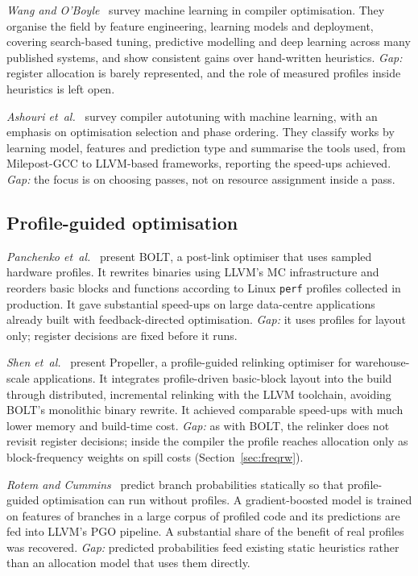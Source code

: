 \documentclass{ieeeaccess}
\begin{document}
\textit{Wang and O'Boyle}~\cite{wang2018ml} survey machine learning in
compiler optimisation. They organise the field by feature engineering,
learning models and deployment, covering search-based tuning,
predictive modelling and deep learning across many published systems,
and show consistent gains over hand-written heuristics.
\textit{Gap:} register allocation is barely represented, and the role of
measured profiles inside heuristics is left open.

\textit{Ashouri et~al.}~\cite{ashouri2018survey} survey compiler
autotuning with machine learning, with an emphasis on optimisation
selection and phase ordering. They classify works by learning model,
features and prediction type and summarise the tools used, from
Milepost-GCC to LLVM-based frameworks, reporting the speed-ups achieved.
\textit{Gap:} the focus is on choosing passes, not on resource
assignment inside a pass.

\subsection{Profile-guided optimisation}

\textit{Panchenko et~al.}~\cite{panchenko2019bolt} present BOLT, a
post-link optimiser that uses sampled hardware profiles. It rewrites
binaries using LLVM's MC infrastructure and reorders basic blocks and
functions according to Linux \texttt{perf} profiles collected in
production. It gave substantial speed-ups on large data-centre
applications already built with feedback-directed optimisation.
\textit{Gap:} it uses profiles for layout only; register decisions are
fixed before it runs.

\textit{Shen et~al.}~\cite{shen2023propeller} present Propeller, a
profile-guided relinking optimiser for warehouse-scale applications. It
integrates profile-driven basic-block layout into the build through
distributed, incremental relinking with the LLVM toolchain, avoiding
BOLT's monolithic binary rewrite. It achieved comparable speed-ups with
much lower memory and build-time cost. \textit{Gap:} as with BOLT, the
relinker does not revisit register decisions; inside the compiler the
profile reaches allocation only as block-frequency weights on spill
costs (Section~\ref{sec:freqrw}).

\textit{Rotem and Cummins}~\cite{rotem2021pgo} predict branch
probabilities statically so that profile-guided optimisation can run
without profiles. A gradient-boosted model is trained on features of
branches in a large corpus of profiled code and its predictions are fed
into LLVM's PGO pipeline. A substantial share of the benefit of real
profiles was recovered. \textit{Gap:} predicted probabilities feed
existing static heuristics rather than an allocation model that uses
them directly.
\end{document}
